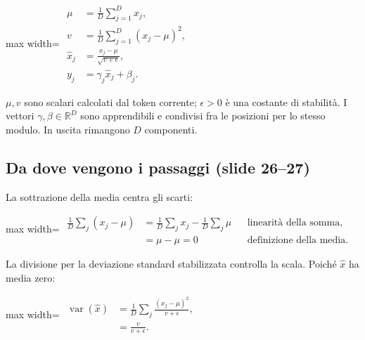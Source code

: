 \documentclass[11pt,a4paper,oneside,openany]{book}
\begin{document}
\begin{center}
\begin{adjustbox}{max width=\linewidth}
$\displaystyle \boxed{\begin{aligned}
\mu&=\frac1D\sum_{j=1}^{D}x_j,\\
v&=\frac1D\sum_{j=1}^{D}(x_j-\mu)^2,\\
\widehat x_j&=\frac{x_j-\mu}{\sqrt{v+\epsilon}},\\
y_j&=\gamma_j\widehat x_j+\beta_j.
\end{aligned}}$
\end{adjustbox}
\end{center}

\(\mu,v\) sono scalari calcolati dal token corrente; \(\epsilon>0\) è una costante di stabilità. I vettori \(\gamma,\beta\in\mathbb R^D\) sono apprendibili e condivisi fra le posizioni per lo stesso modulo. In uscita rimangono \(D\) componenti.

\subsection{Da dove vengono i passaggi (slide 26--27)}\label{f04-r409}

La sottrazione della media centra gli scarti:

\begin{center}
\begin{adjustbox}{max width=\linewidth}
$\displaystyle 
\begin{aligned}
\frac1D\sum_j(x_j-\mu)
&=\frac1D\sum_jx_j-\frac1D\sum_j\mu
&&\text{linearità della somma},\\
&=\mu-\mu=0
&&\text{definizione della media}.
\end{aligned}
$
\end{adjustbox}
\end{center}

La divisione per la deviazione standard stabilizzata controlla la scala. Poiché \(\widehat x\) ha media zero:

\begin{center}
\begin{adjustbox}{max width=\linewidth}
$\displaystyle 
\begin{aligned}
\operatorname{var}(\widehat x)
&=\frac1D\sum_j\frac{(x_j-\mu)^2}{v+\epsilon},\\
&=\frac{v}{v+\epsilon}.
\end{aligned}
$
\end{adjustbox}
\end{center}
\end{document}
